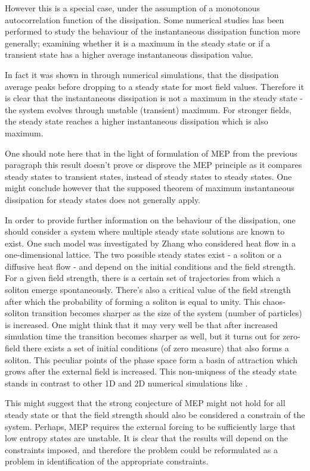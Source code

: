 \documentclass[a4paper,12pt]{article}
\begin{document}
However this is a special case, under the assumption of a monotonous autocorrelation function of the dissipation. Some numerical studies has been performed to study the behaviour of the instantaneous dissipation function more generally; examining whether it is a maximum in the steady state or if a transient state has a higher average instantaneous dissipation value.

In fact it was shown in \cite{Brookes:2011hu} through numerical simulations, that the dissipation average peaks before dropping to a steady state for most field values. Therefore it is clear that the instantaneous dissipation is not a maximum in the steady state - the system evolves through unstable (transient) maximum. For stronger fields, the steady state reaches a higher instantaneous dissipation which is also maximum.

One should note here that in the light of formulation of MEP from the previous paragraph this result doesn't prove or disprove the MEP principle as it compares steady states to transient states, instead of steady states to steady states. One might conclude however that the supposed theorem of maximum instantaneous dissipation for steady states does not generally apply.

In order to provide further information on the behaviour of the dissipation, one should consider a system where multiple steady state solutions are known to exist. One such model was investigated by Zhang\cite{Zhang:2001jc} who considered heat flow in a one-dimensional lattice. The two possible steady states exist - a soliton or a diffusive heat flow - and depend on the initial conditions and the field strength.
For a given field strength, there is a certain set of trajectories from which a soliton emerge spontaneously. There's also a critical value of the field strength after which the probability of forming a soliton is equal to unity. This chaos-soliton transition becomes sharper as the size of the system (number of particles) is increased. One might think that it may very well be that after increased simulation time the transition becomes sharper as well, but it turns out for zero-field there exists a set of initial conditions (of zero measure) that also forms a soliton. This peculiar points of the phase space form a basin of attraction which grows after the external field is increased. This non-uniqness of the steady state stands in contrast to other 1D and 2D  numerical simulations like \cite{Maeda:1995bj}.

This might suggest that the strong conjecture of MEP might not hold for all steady state or that the field strength should also be considered a constrain of the system.
Perhaps, MEP requires the external forcing to be sufficiently large that low entropy states are unstable. It is clear that the results will depend on the constraints imposed, and therefore the problem could be reformulated as a problem in identification of the appropriate constraints.
\end{document}
